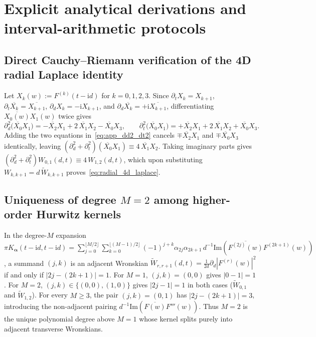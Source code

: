 \documentclass[11pt,reqno]{amsart}
\theoremstyle{definition}
\theoremstyle{remark}
\numberwithin{equation}{section}
\newcommand{\ii}{\mathrm{i}}
\newcommand{\Ima}{\mathrm{Im}}
\begin{document}
\appendix

\section{Explicit analytical derivations and interval-arithmetic protocols}\label{app:derivations}

\subsection{Direct Cauchy--Riemann verification of the 4D radial Laplace identity}\label{app:laplace_cr}

Let $X_k(w) := F^{(k)}(t - \ii d)$ for $k = 0, 1, 2, 3$. Since $\partial_t X_k = X_{k+1}$, $\partial_t\overline{X_k} = \overline{X_{k+1}}$, $\partial_d X_k = -\ii X_{k+1}$, and $\partial_d\overline{X_k} = +\ii\overline{X_{k+1}}$, differentiating $\overline{X_0(w)}X_1(w)$ twice gives
\begin{equation}\label{eq:app_dd2_dt2}
\partial_d^2\bigl(\overline{X_0}X_1\bigr) = -\overline{X_2}X_1 + 2\,\overline{X_1}X_2 - \overline{X_0}X_3, \qquad \partial_t^2\bigl(\overline{X_0}X_1\bigr) = +\overline{X_2}X_1 + 2\,\overline{X_1}X_2 + \overline{X_0}X_3.
\end{equation}
Adding the two equations in~\eqref{eq:app_dd2_dt2} cancels $\mp\overline{X_2}X_1$ and $\mp\overline{X_0}X_3$ identically, leaving $(\partial_d^2 + \partial_t^2)(\overline{X_0}X_1) \equiv 4\,\overline{X_1}X_2$. Taking imaginary parts gives $(\partial_d^2 + \partial_t^2)W_{0,1}(d,t) \equiv 4\,W_{1,2}(d,t)$, which upon substituting $W_{k,k+1} = d\,\widetilde{W}_{k,k+1}$ proves~\eqref{eq:radial_4d_laplace}.

\subsection{Uniqueness of degree $M=2$ among higher-order Hurwitz kernels}\label{app:uniqueness_M2}

In the degree-$M$ expansion $\pi K_{\boldsymbol{\alpha}}(t-\ii d, t-\ii d) = \sum_{j=0}^{\lfloor M/2\rfloor}\sum_{k=0}^{\lfloor(M-1)/2\rfloor} (-1)^{j+k}\alpha_{2j}\alpha_{2k+1}\,d^{-1}\Ima(\overline{F^{(2j)}(w)}F^{(2k+1)}(w))$, a summand $(j,k)$ is an adjacent Wronskian $\widetilde{W}_{r,r+1}(d,t) = \frac{1}{2d}\partial_d|F^{(r)}(w)|^2$ if and only if $|2j - (2k+1)| = 1$. For $M = 1$, $(j,k) = (0,0)$ gives $|0 - 1| = 1$. For $M = 2$, $(j,k) \in \{(0,0), (1,0)\}$ gives $|2j - 1| = 1$ in both cases ($\widetilde{W}_{0,1}$ and $\widetilde{W}_{1,2}$). For every $M \ge 3$, the pair $(j,k) = (0,1)$ has $|2j - (2k+1)| = 3$, introducing the non-adjacent pairing $d^{-1}\Ima(\overline{F(w)}F'''(w))$. Thus $M = 2$ is the unique polynomial degree above $M = 1$ whose kernel splits purely into adjacent transverse Wronskians.
\end{document}
